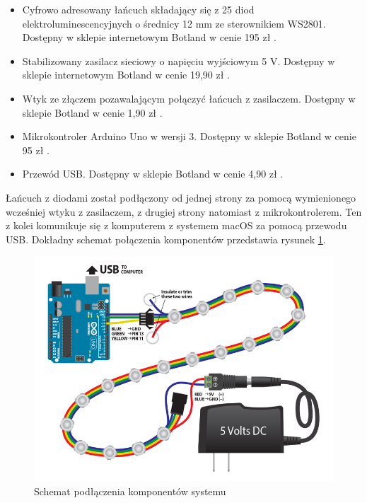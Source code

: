 \documentclass[12pt]{report}
\begin{document}
\begin{itemize}
	\item Cyfrowo adresowany łańcuch składający się z 25 diod elektroluminescencyjnych o średnicy 12 mm ze sterownikiem WS2801. Dostępny w sklepie internetowym Botland w cenie 195 zł \cite{diody}.
	\item Stabilizowany zasilacz sieciowy o napięciu wyjściowym 5 V. Dostępny w sklepie internetowym Botland w cenie 19,90 zł \cite{zasilacz}.
	\item Wtyk ze złączem pozawalającym połączyć łańcuch z zasilaczem. Dostępny w sklepie Botland w cenie 1,90 zł \cite{wtyk}.
	\item Mikrokontroler Arduino Uno w wersji 3. Dostępny w sklepie Botland w cenie 95 zł \cite{arduino}.
	\item Przewód USB. Dostępny w sklepie Botland w cenie 4,90 zł \cite{usb}.
\end{itemize}

Łańcuch z diodami został podłączony od jednej strony za pomocą wymienionego wcześniej wtyku z zasilaczem, z drugiej strony natomiast z mikrokontrolerem. Ten z kolei komunikuje się z komputerem z systemem macOS za pomocą przewodu USB. Dokładny schemat połączenia komponentów przedstawia rysunek \ref{schemat}.
	
\begin{figure}[h]
\centering
\includegraphics[width=\textwidth]{../resources/wiring.png}
\caption[Schemat podłączenia komponentów systemu]{Schemat podłączenia komponentów systemu \cite{schemat}}
\label{schemat}
\end{figure}
		
\end{document}
